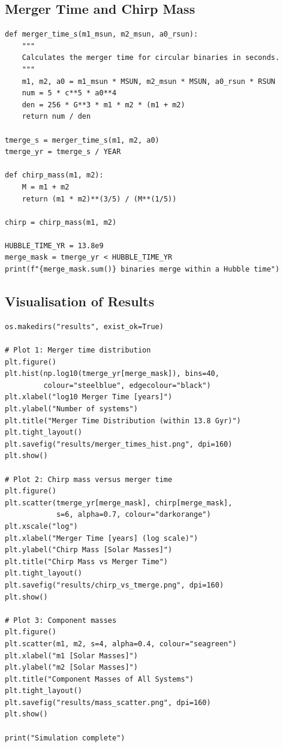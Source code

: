 \documentclass[12pt,a4paper]{article}
\begin{document}
\subsection{Merger Time and Chirp Mass}
\begin{lstlisting}[style=pythonstyle]
def merger_time_s(m1_msun, m2_msun, a0_rsun):
    """
    Calculates the merger time for circular binaries in seconds.
    """
    m1, m2, a0 = m1_msun * MSUN, m2_msun * MSUN, a0_rsun * RSUN
    num = 5 * c**5 * a0**4
    den = 256 * G**3 * m1 * m2 * (m1 + m2)
    return num / den

tmerge_s = merger_time_s(m1, m2, a0)
tmerge_yr = tmerge_s / YEAR

def chirp_mass(m1, m2):
    M = m1 + m2
    return (m1 * m2)**(3/5) / (M**(1/5))

chirp = chirp_mass(m1, m2)

HUBBLE_TIME_YR = 13.8e9
merge_mask = tmerge_yr < HUBBLE_TIME_YR
print(f"{merge_mask.sum()} binaries merge within a Hubble time")
\end{lstlisting}

\subsection{Visualisation of Results}
\begin{lstlisting}[style=pythonstyle]
os.makedirs("results", exist_ok=True)

# Plot 1: Merger time distribution
plt.figure()
plt.hist(np.log10(tmerge_yr[merge_mask]), bins=40,
         colour="steelblue", edgecolour="black")
plt.xlabel("log10 Merger Time [years]")
plt.ylabel("Number of systems")
plt.title("Merger Time Distribution (within 13.8 Gyr)")
plt.tight_layout()
plt.savefig("results/merger_times_hist.png", dpi=160)
plt.show()

# Plot 2: Chirp mass versus merger time
plt.figure()
plt.scatter(tmerge_yr[merge_mask], chirp[merge_mask],
            s=6, alpha=0.7, colour="darkorange")
plt.xscale("log")
plt.xlabel("Merger Time [years] (log scale)")
plt.ylabel("Chirp Mass [Solar Masses]")
plt.title("Chirp Mass vs Merger Time")
plt.tight_layout()
plt.savefig("results/chirp_vs_tmerge.png", dpi=160)
plt.show()

# Plot 3: Component masses
plt.figure()
plt.scatter(m1, m2, s=4, alpha=0.4, colour="seagreen")
plt.xlabel("m1 [Solar Masses]")
plt.ylabel("m2 [Solar Masses]")
plt.title("Component Masses of All Systems")
plt.tight_layout()
plt.savefig("results/mass_scatter.png", dpi=160)
plt.show()

print("Simulation complete")
\end{lstlisting}
\end{document}
